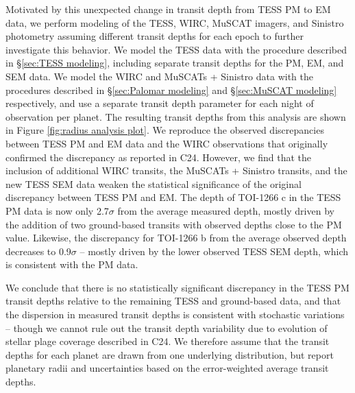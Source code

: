 \documentclass[twocolumn]{aastex631}
\begin{document}
Motivated by this unexpected change in transit depth from TESS PM to EM data, we perform modeling of the TESS, WIRC, MuSCAT imagers, and Sinistro photometry assuming different transit depths for each epoch to further investigate this behavior. We model the TESS data with the procedure described in \S\ref{sec:TESS modeling}, including separate transit depths for the PM, EM, and SEM data. We model the WIRC and MuSCATs + Sinistro data with the procedures described in \S\ref{sec:Palomar modeling} and \S\ref{sec:MuSCAT modeling} respectively, and use a separate transit depth parameter for each night of observation per planet. The resulting transit depths from this analysis are shown in Figure \ref{fig:radius analysis plot}. We reproduce the observed discrepancies between TESS PM and EM data and the WIRC observations that originally confirmed the discrepancy as reported in C24. However, we find that the inclusion of additional WIRC transits, the MuSCATs + Sinistro transits, and the new TESS SEM data weaken the statistical significance of the original discrepancy between TESS PM and EM. The depth of TOI-1266 c in the TESS PM data is now only 2.7$\sigma$ from the average measured depth, mostly driven by the addition of two ground-based transits with observed depths close to the PM value. Likewise, the discrepancy for TOI-1266 b from the average observed depth decreases to 0.9$\sigma$ -- mostly driven by the lower observed TESS SEM depth, which is consistent with the PM data. 

We conclude that there is no statistically significant discrepancy in the TESS PM transit depths relative to the remaining TESS and ground-based data, and that the dispersion in measured transit depths is consistent with stochastic variations -- though we cannot rule out the transit depth variability due to evolution of stellar plage coverage described in C24. We therefore assume that the transit depths for each planet are drawn from one underlying distribution, but report planetary radii and uncertainties based on the error-weighted average transit depths. 
\end{document}
